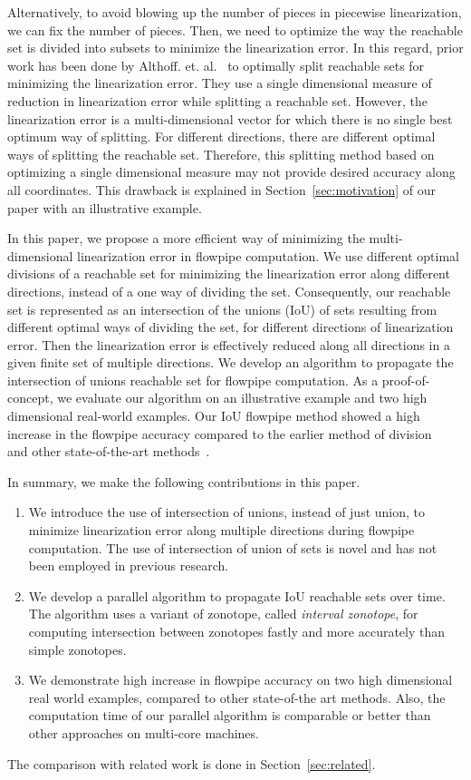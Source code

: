 Alternatively, to avoid blowing up the number of pieces in piecewise
linearization, we can fix the number of pieces.  Then, we need to
optimize the way the reachable set is divided into subsets to minimize
the linearization error.  In this regard, prior work has been done by
Althoff. et. al.~\cite{althoff2008reachability} to optimally split
reachable sets for minimizing the linearization error.  They use a
single dimensional measure of reduction in linearization error while
splitting a reachable set.  However, the linearization error is a
multi-dimensional vector for which there is no single best optimum way
of splitting.  For different directions, there are different optimal
ways of splitting the reachable set.  Therefore, this splitting method
based on optimizing a single dimensional measure may not provide
desired accuracy along all coordinates.  This drawback is explained in
Section~\ref{sec:motivation} of our paper with an illustrative
example.

In this paper, we propose a more efficient way of minimizing the
multi-dimensional linearization error in flowpipe computation.  We use
different optimal divisions of a reachable set for minimizing the
linearization error along different directions, instead of a one way
of dividing the set.  Consequently, our reachable set is represented
as an intersection of the unions (IoU) of sets resulting from
different optimal ways of dividing the set, for different directions
of linearization error.  Then the linearization error is effectively
reduced along all directions in a given finite set of multiple
directions.  We develop an algorithm to propagate the intersection of
unions reachable set for flowpipe computation.  As a proof-of-concept,
we evaluate our algorithm on an illustrative example and two high
dimensional real-world examples. Our IoU flowpipe method showed a high
increase in the flowpipe accuracy compared to the earlier method of
division~~\cite{althoff2008reachability} and other state-of-the-art
methods~\cite{chen2012taylor,althoff2013reachability}.

In summary, we make the following contributions in this paper.
\begin{enumerate}
\item We introduce the use of intersection of unions, instead of
    just union, to minimize linearization error along multiple
    directions during flowpipe computation.  The use of intersection
    of union of sets is novel and has not been employed in previous
    research.
%
\item We develop a parallel algorithm to propagate IoU reachable sets
    over time.  The algorithm uses a variant of zonotope,
    called \emph{interval zonotope}, for computing intersection
    between zonotopes fastly and more accurately than simple zonotopes.
%
\item We demonstrate high increase in flowpipe accuracy on two high
    dimensional real world examples, compared to other state-of-the
    art methods.  Also, the computation time of our parallel
    algorithm is comparable or better than other approaches on
    multi-core machines.
\end{enumerate}
%
The comparison with related work is done in Section~\ref{sec:related}.
